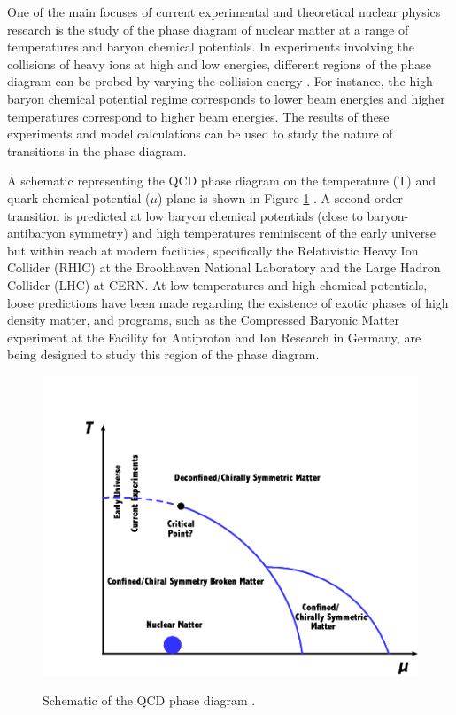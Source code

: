 One of the main focuses of current experimental and theoretical nuclear physics research is the study of the phase diagram of nuclear matter at a range of temperatures and baryon chemical potentials. In experiments involving the collisions of heavy ions at high and low energies, different regions of the phase diagram can be probed by varying the collision energy \cite{PhysRevC.93.024901}. For instance, the high-baryon chemical potential regime corresponds to lower beam energies and higher temperatures correspond to higher beam energies. The results of these experiments and model calculations can be used to study the nature of transitions in the phase diagram.

A schematic representing the QCD phase diagram on the temperature (T) and quark chemical potential ($\mu$) plane is shown in Figure \ref{fig:PhaseDiagram} \cite{1742-6596-761-1-012066}. A second-order transition is predicted at low baryon chemical potentials (close to baryon-antibaryon symmetry) and high temperatures reminiscent of the early universe but within reach at modern facilities, specifically the Relativistic Heavy Ion Collider (RHIC) at the Brookhaven National Laboratory and the Large Hadron Collider (LHC) at CERN. At low temperatures and high chemical potentials, loose predictions have been made regarding the existence of exotic phases of high density matter, and programs, such as the Compressed Baryonic Matter experiment at the Facility for Antiproton and Ion Research in Germany, are being designed to study this region of the phase diagram.

\begin{figure}[h]
  \centering
  \includegraphics[width=5.5in]{figures/1742-6596-761-1-012066.png}\\
  \caption{Schematic of the QCD phase diagram \cite{1742-6596-761-1-012066}.}\label{fig:PhaseDiagram}
\end{figure}


